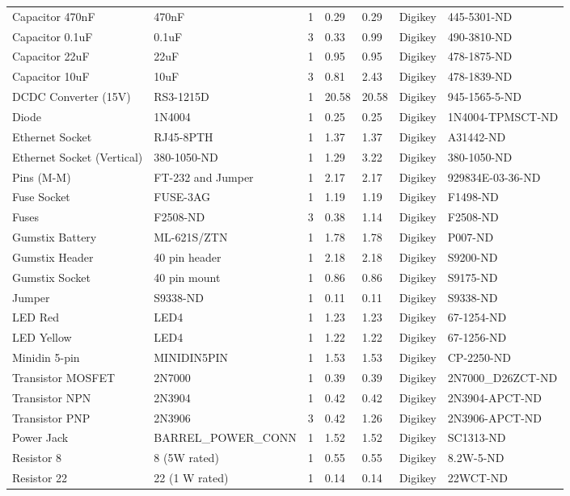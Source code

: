 \begin{landscape}
\begin{center}
\begin{longtable}{|p{2in}|p{1.5in}|p{.75in}|p{.5in}|p{.5in}|p{1in}|p{1.5in}|}
Capacitor 470nF & 470nF & 1 & 0.29 & 0.29 & Digikey & 445-5301-ND\\ 
Capacitor 0.1uF & 0.1uF & 3 & 0.33 & 0.99 & Digikey & 490-3810-ND\\ 
Capacitor 22uF & 22uF & 1 & 0.95 & 0.95 & Digikey & 478-1875-ND\\ 
Capacitor 10uF & 10uF & 3 & 0.81 & 2.43 & Digikey & 478-1839-ND\\ 
DCDC Converter (15V) & RS3-1215D & 1 & 20.58 & 20.58 & Digikey & 945-1565-5-ND\\ 
Diode & 1N4004 & 1 & 0.25 & 0.25 & Digikey & 1N4004-TPMSCT-ND\\ 
Ethernet Socket & RJ45-8PTH & 1 & 1.37 & 1.37 & Digikey & A31442-ND\\ 
Ethernet Socket (Vertical) & 380-1050-ND & 1 & 1.29 & 3.22 & Digikey & 380-1050-ND\\ 
Pins (M-M) & FT-232 and Jumper & 1 & 2.17 & 2.17 & Digikey & 929834E-03-36-ND\\ 
Fuse Socket & FUSE-3AG & 1 & 1.19 & 1.19 & Digikey & F1498-ND\\ 
Fuses & F2508-ND & 3 & 0.38 & 1.14 & Digikey & F2508-ND\\ 
Gumstix Battery & ML-621S/ZTN & 1 & 1.78 & 1.78 & Digikey & P007-ND\\ 
Gumstix Header & 40 pin header & 1 & 2.18 & 2.18 & Digikey & S9200-ND\\ 
Gumstix Socket & 40 pin mount & 1 & 0.86 & 0.86 & Digikey & S9175-ND\\ 
Jumper & S9338-ND & 1 & 0.11 & 0.11 & Digikey & S9338-ND\\ 
LED Red & LED4 & 1 & 1.23 & 1.23 & Digikey & 67-1254-ND\\ 
LED Yellow & LED4 & 1 & 1.22 & 1.22 & Digikey & 67-1256-ND\\ 
Minidin 5-pin & MINIDIN5PIN & 1 & 1.53 & 1.53 & Digikey & CP-2250-ND\\ 
Transistor MOSFET & 2N7000 & 1 & 0.39 & 0.39 & Digikey & 2N7000\_D26ZCT-ND\\ 
Transistor NPN & 2N3904 & 1 & 0.42 & 0.42 & Digikey & 2N3904-APCT-ND\\ 
Transistor PNP & 2N3906 & 3 & 0.42 & 1.26 & Digikey & 2N3906-APCT-ND\\ 
Power Jack & BARREL\_POWER\_CONN & 1 & 1.52 & 1.52 & Digikey & SC1313-ND\\ 
Resistor 8 & 8 (5W rated) & 1 & 0.55 & 0.55 & Digikey & 8.2W-5-ND\\ 
Resistor 22 & 22 (1 W rated) & 1 & 0.14 & 0.14 & Digikey & 22WCT-ND\\ 

\end{longtable}
\end{center}
\end{landscape}
